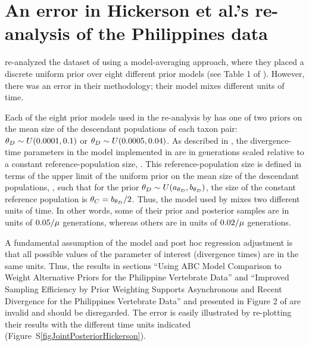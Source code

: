 \section{An error in Hickerson et al.'s re-analysis of the Philippines data}
\citet{Hickerson2013} re-analyzed the dataset of \citet{Oaks2012} using a
model-averaging approach, where they placed a discrete uniform prior over eight
different prior models (see Table 1 of \citet{Hickerson2013}).
However, there was an error in their methodology; their model mixes different
units of time.

Each of the eight prior models used in the re-analysis by \citet{Hickerson2013}
has one of two priors on the mean size of the descendant populations of each
taxon pair:
$\meanDescendantTheta{} \sim U(0.0001, 0.1)$ or
$\meanDescendantTheta{} \sim U(0.0005, 0.04)$.
As described in \citet{Oaks2012}, the divergence-time parameters in the model
implemented in \msb are in generations scaled relative to a constant
reference-population size, .
This reference-population size is defined in terms of the upper limit of the
uniform prior on the mean size of the descendant populations,
\meanDescendantTheta{}, such that for the prior $\meanDescendantTheta{} \sim
U(\uniformMin{\meanDescendantTheta{}},\uniformMax{\meanDescendantTheta{}})$,
the size of the constant reference population is $\myTheta{C} =
\uniformMax{\meanDescendantTheta{}}/2$.
Thus, the model used by \citet{Hickerson2013} mixes two different units of
time.
In other words, some of their prior and posterior samples are in units of
$0.05/\mu$ generations, whereas others are in units of
$0.02/\mu$ generations.

A fundamental assumption of the \msb model and post hoc regression adjustment
is that all possible values of the parameter of interest (divergence times) are
in the same units.
Thus, the results in sections ``Using ABC Model Comparison to Weight
Alternative Priors for the Philippine Vertebrate Data'' and ``Improved Sampling
Efficiency by Prior Weighting Supports Asynchronous and Recent Divergence for
the Philippines Vertebrate Data'' and presented in Figure 2 of
\citet{Hickerson2013} are invalid and should be disregarded.
The error is easily illustrated by re-plotting their results with the different
time units indicated (Figure~S\ref{figJointPosteriorHickerson}).

